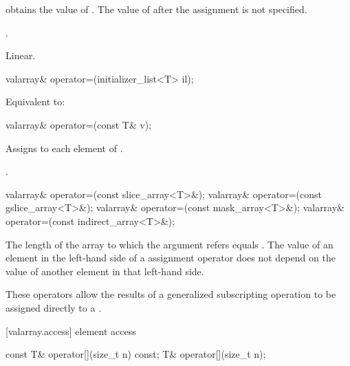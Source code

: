 \begin{itemdescr}
\pnum
\effects {} obtains the value of .
The value of  after the assignment is not specified.

\pnum
\returns {}.

\pnum
\complexity Linear.
\end{itemdescr}

%
\begin{itemdecl}
valarray& operator=(initializer_list<T> il);
\end{itemdecl}

\begin{itemdescr}
\pnum
\effects Equivalent to: 
\end{itemdescr}


%
\begin{itemdecl}
valarray& operator=(const T& v);
\end{itemdecl}

\begin{itemdescr}
\pnum
\effects
Assigns  to each element of .

\pnum
\returns {}.
\end{itemdescr}

%
\begin{itemdecl}
valarray& operator=(const slice_array<T>&);
valarray& operator=(const gslice_array<T>&);
valarray& operator=(const mask_array<T>&);
valarray& operator=(const indirect_array<T>&);
\end{itemdecl}

\begin{itemdescr}
\pnum
\requires The length of the array to which the argument refers equals .
The value of an element in the left-hand side of a  assignment
operator does not depend on the value of another element in that left-hand side.

\pnum
These operators allow the results of a generalized subscripting operation
to be assigned directly to a
.
\end{itemdescr}

[valarray.access]{ element access}

%
\begin{itemdecl}
const T&  operator[](size_t n) const;
T& operator[](size_t n);
\end{itemdecl}

